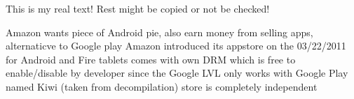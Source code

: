 This is my real text! Rest might be copied or not be checked!

Amazon wants piece of Android pie, also earn money from selling apps, alternaticve to Google play
Amazon introduced its appstore on the 03/22/2011 for Android and Fire tablets
comes with own DRM which is free to enable/disable by developer\cite{amazonBeta} since the Google LVL only works with Google Play
named Kiwi (taken from decompilation)
store is completely independent
\cite{amazonRelease}
